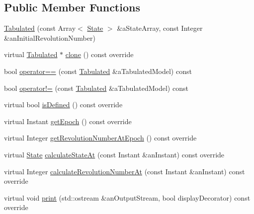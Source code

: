 \subsection*{Public Member Functions}
\begin{DoxyCompactItemize}
\item 
\hyperlink{classlibrary_1_1astro_1_1trajectory_1_1orbit_1_1models_1_1_tabulated_a9110680d47c9dcf4272432aa4b299947}{Tabulated} (const Array$<$ \hyperlink{classlibrary_1_1astro_1_1trajectory_1_1_state}{State} $>$ \&a\+State\+Array, const Integer \&an\+Initial\+Revolution\+Number)
\item 
virtual \hyperlink{classlibrary_1_1astro_1_1trajectory_1_1orbit_1_1models_1_1_tabulated}{Tabulated} $\ast$ \hyperlink{classlibrary_1_1astro_1_1trajectory_1_1orbit_1_1models_1_1_tabulated_a8ccec23a49086c6c3fbda2cc81e7a4dc}{clone} () const override
\item 
bool \hyperlink{classlibrary_1_1astro_1_1trajectory_1_1orbit_1_1models_1_1_tabulated_aac67f48eb523ce183d726e6662335969}{operator==} (const \hyperlink{classlibrary_1_1astro_1_1trajectory_1_1orbit_1_1models_1_1_tabulated}{Tabulated} \&a\+Tabulated\+Model) const
\item 
bool \hyperlink{classlibrary_1_1astro_1_1trajectory_1_1orbit_1_1models_1_1_tabulated_a77401f8044dd31fe8ce843091440e27b}{operator!=} (const \hyperlink{classlibrary_1_1astro_1_1trajectory_1_1orbit_1_1models_1_1_tabulated}{Tabulated} \&a\+Tabulated\+Model) const
\item 
virtual bool \hyperlink{classlibrary_1_1astro_1_1trajectory_1_1orbit_1_1models_1_1_tabulated_af68120eb6651e8461c02a465923e533f}{is\+Defined} () const override
\item 
virtual Instant \hyperlink{classlibrary_1_1astro_1_1trajectory_1_1orbit_1_1models_1_1_tabulated_a9e12e7f7b79bf8d2d37494ff7a55ae1d}{get\+Epoch} () const override
\item 
virtual Integer \hyperlink{classlibrary_1_1astro_1_1trajectory_1_1orbit_1_1models_1_1_tabulated_aece7054c261932c3298e8ef2faa2d588}{get\+Revolution\+Number\+At\+Epoch} () const override
\item 
virtual \hyperlink{classlibrary_1_1astro_1_1trajectory_1_1_state}{State} \hyperlink{classlibrary_1_1astro_1_1trajectory_1_1orbit_1_1models_1_1_tabulated_a43db203d7257d25a5a3a6f0e03e62b7d}{calculate\+State\+At} (const Instant \&an\+Instant) const override
\item 
virtual Integer \hyperlink{classlibrary_1_1astro_1_1trajectory_1_1orbit_1_1models_1_1_tabulated_aef0c3d3790f5399c9ae9f78a543a9d5b}{calculate\+Revolution\+Number\+At} (const Instant \&an\+Instant) const override
\item 
virtual void \hyperlink{classlibrary_1_1astro_1_1trajectory_1_1orbit_1_1models_1_1_tabulated_a545a7209580a0c3863f37e2bdd925cb6}{print} (std\+::ostream \&an\+Output\+Stream, bool display\+Decorator) const override
\end{DoxyCompactItemize}
